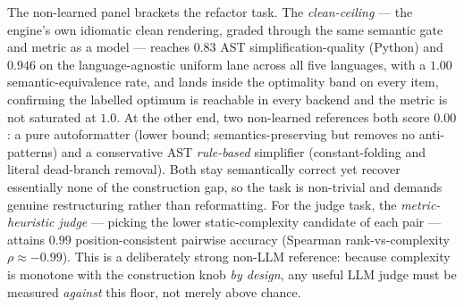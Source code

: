 The non-learned panel brackets the refactor task. The \emph{clean-ceiling} --- the
engine's own idiomatic clean rendering, graded through the same semantic gate and
metric as a model --- reaches $0.83$ AST simplification-quality (Python) and $0.946$ on
the language-agnostic uniform lane across all five languages, with a $1.00$
semantic-equivalence rate, and lands inside the optimality band on every item, confirming
the labelled optimum is reachable in every backend and the metric is not saturated at $1.0$. At the other
end, two non-learned references both score $0.00$: a pure autoformatter (lower bound;
semantics-preserving but removes no anti-patterns) and a conservative AST
\emph{rule-based} simplifier (constant-folding and literal dead-branch removal). Both stay
semantically correct yet recover essentially none of the construction gap, so the task is
non-trivial and demands genuine restructuring rather than reformatting. For the judge
task, the \emph{metric-heuristic judge} --- picking the lower static-complexity candidate
of each pair --- attains $0.99$ position-consistent pairwise accuracy (Spearman
rank-vs-complexity $\rho \approx -0.99$). This is a deliberately strong non-LLM reference:
because complexity is monotone with the construction knob \emph{by design}, any useful LLM
judge must be measured \emph{against} this floor, not merely above chance.

